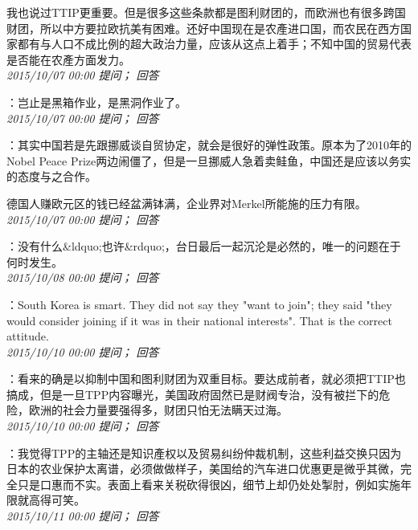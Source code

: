 \documentclass[twocolumn]{ctexart}
\begin{document}
我也说过TTIP更重要。但是很多这些条款都是图利财团的，而欧洲也有很多跨国财团，所以中方要拉欧抗美有困难。还好中国现在是农產进口国，而农民在西方国家都有与人口不成比例的超大政治力量，应该从这点上着手；不知中国的贸易代表是否能在农產方面发力。\\

\textit{\hfill\noindent\small 2015/10/07 00:00 提问； 回答}

：岂止是黑箱作业，是黑洞作业了。\\

\textit{\hfill\noindent\small 2015/10/07 00:00 提问； 回答}

：其实中国若是先跟挪威谈自贸协定，就会是很好的弹性政策。原本为了2010年的Nobel Peace Prize两边闹僵了，但是一旦挪威人急着卖鲑鱼，中国还是应该以务实的态度与之合作。

德国人赚欧元区的钱已经盆满钵满，企业界对Merkel所能施的压力有限。\\

\textit{\hfill\noindent\small 2015/10/07 00:00 提问； 回答}

：没有什么\&ldquo;也许\&rdquo;，台日最后一起沉沦是必然的，唯一的问题在于何时发生。\\

\textit{\hfill\noindent\small 2015/10/08 00:00 提问； 回答}

：South Korea is smart. They did not say they "want to join"; they said "they would consider joining if it was in their national interests". That is the correct attitude.\\

\textit{\hfill\noindent\small 2015/10/10 00:00 提问； 回答}

：看来的确是以抑制中国和图利财团为双重目标。要达成前者，就必须把TTIP也搞成，但是一旦TPP内容曝光，美国政府固然已是财阀专治，没有被拦下的危险，欧洲的社会力量要强得多，财团只怕无法瞒天过海。\\

\textit{\hfill\noindent\small 2015/10/10 00:00 提问； 回答}

：我觉得TPP的主轴还是知识產权以及贸易纠纷仲裁机制，这些利益交换只因为日本的农业保护太离谱，必须做做样子，美国给的汽车进口优惠更是微乎其微，完全只是口惠而不实。表面上看来关税砍得很凶，细节上却仍处处掣肘，例如实施年限就高得可笑。\\

\textit{\hfill\noindent\small 2015/10/11 00:00 提问； 回答}
\end{document}
